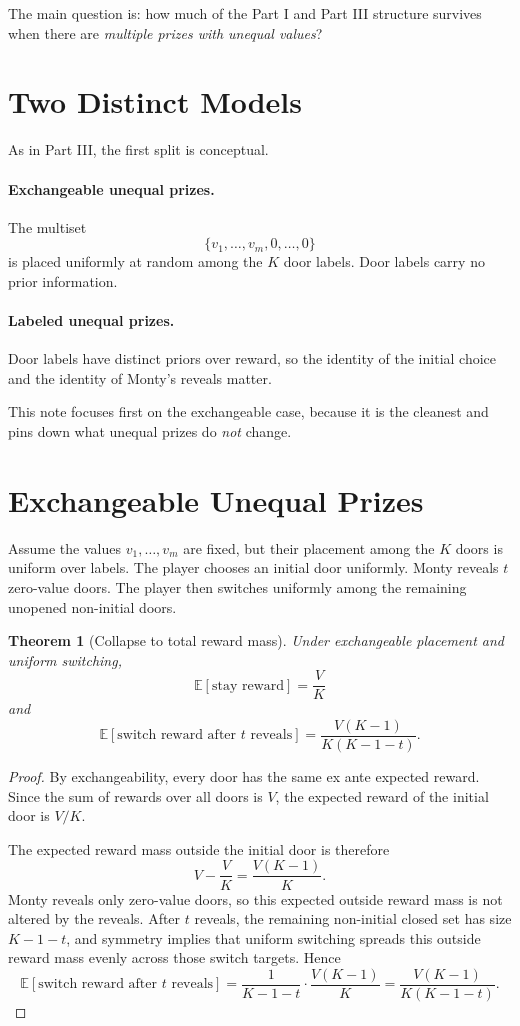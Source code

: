 \documentclass[11pt]{article}
\newtheorem{theorem}{Theorem}
\newcommand{\E}{\mathbb{E}}
\begin{document}
The main question is: how much of the Part I and Part III structure survives
when there are \emph{multiple prizes with unequal values}?

\section{Two Distinct Models}

As in Part III, the first split is conceptual.

\paragraph{Exchangeable unequal prizes.}
The multiset
\[
  \{v_1,\dots,v_m,0,\dots,0\}
\]
is placed uniformly at random among the $K$ door labels. Door labels carry no
prior information.

\paragraph{Labeled unequal prizes.}
Door labels have distinct priors over reward, so the identity of the initial
choice and the identity of Monty's reveals matter.

This note focuses first on the exchangeable case, because it is the cleanest
and pins down what unequal prizes do \emph{not} change.

\section{Exchangeable Unequal Prizes}

Assume the values $v_1,\dots,v_m$ are fixed, but their placement among the $K$
doors is uniform over labels. The player chooses an initial door uniformly.
Monty reveals $t$ zero-value doors. The player then switches uniformly among
the remaining unopened non-initial doors.

\begin{theorem}[Collapse to total reward mass]
Under exchangeable placement and uniform switching,
\[
  \E[\text{stay reward}]=\frac{V}{K}
\]
and
\[
  \E[\text{switch reward after }t\text{ reveals}]
  =
  \frac{V(K-1)}{K(K-1-t)}.
\]
\end{theorem}

\begin{proof}
By exchangeability, every door has the same ex ante expected reward. Since the
sum of rewards over all doors is $V$, the expected reward of the initial door is
$V/K$.

The expected reward mass outside the initial door is therefore
\[
  V-\frac{V}{K}=\frac{V(K-1)}{K}.
\]
Monty reveals only zero-value doors, so this expected outside reward mass is not
altered by the reveals. After $t$ reveals, the remaining non-initial closed set
has size $K-1-t$, and symmetry implies that uniform switching spreads this
outside reward mass evenly across those switch targets. Hence
\[
  \E[\text{switch reward after }t\text{ reveals}]
  =
  \frac{1}{K-1-t}\cdot\frac{V(K-1)}{K}
  =
  \frac{V(K-1)}{K(K-1-t)}.
\]
\end{proof}
\end{document}
